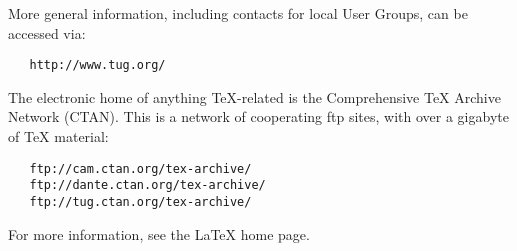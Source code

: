 \documentclass[a4paper]{article}
\begin{document}
More general information, including contacts for local User Groups,
can be accessed via:
\begin{verbatim}
   http://www.tug.org/
\end{verbatim}

The electronic home of anything \TeX-related is the Comprehensive
\TeX{} Archive Network (CTAN).  This is a network of cooperating ftp
sites, with over a gigabyte of \TeX{} material:
\begin{verbatim}
   ftp://cam.ctan.org/tex-archive/
   ftp://dante.ctan.org/tex-archive/
   ftp://tug.ctan.org/tex-archive/
\end{verbatim}

For more information, see the \LaTeX{} home page.
\end{document}
